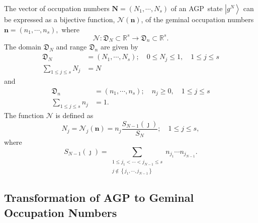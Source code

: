 \documentclass[aps,preprint]{revtex4}%
\begin{document}
The vector of occupation numbers $\mathbf{N}=\left(  N_{1},\cdots
,N_{s}\right)  $ of an AGP\ state $\left\vert g^{N}\right\rangle $ can be
expressed as a bijective function, $\mathcal{N}\left(  \mathbf{n}\right)  $,
of the geminal occupation numbers $\mathbf{n}=\left(  n_{1},\cdots
,n_{s}\right)  ,$ where
\begin{equation}
\mathcal{N}:\mathfrak{D}_{N}\subset\mathbb{R}^{s}\rightarrow\mathfrak{D}%
_{n}\subset\mathbb{R}^{s}.
\end{equation}
The domain $\mathfrak{D}_{N}$ and range $\mathfrak{D}_{n}$ are given by%
\begin{align}
\mathfrak{D}_{N} &  =\left(  N_{1},\cdots,N_{s}\right)  ;\quad0\leq N_{j}%
\leq1,\quad1\leq j\leq s\nonumber\\
\sum_{1\leq j\leq s}N_{j} &  =N
\end{align}
and
\begin{align}
\mathfrak{D}_{n} &  =\left(  n_{1},\cdots,n_{s}\right)  ;\quad n_{j}%
\geq0,\quad1\leq j\leq s\nonumber\\
\sum_{1\leq j\leq s}n_{j} &  =1.
\end{align}
The function $\mathcal{N}$ is defined as
\begin{equation}
N_{j}=\mathcal{N}_{j}\left(  \mathbf{n}\right)  =n_{j}\frac{S_{N-1}\left(
\jmath\right)  }{S_{N}};\quad1\leq j\leq s,
\end{equation}
where
\begin{equation}
S_{N-1}\left(  \jmath\right)  =\sum_{\substack{1\leq j_{1}<\cdots<j_{N-1}\leq
s\\j\notin\left\{  j_{1},\cdots,j_{N-1}\right\}  }}n_{j_{1}}\cdots n_{j_{N-1}%
}.
\end{equation}


\subsection{Transformation of AGP to Geminal Occupation
Numbers\label{AGPoccGemocc}}
\end{document}
